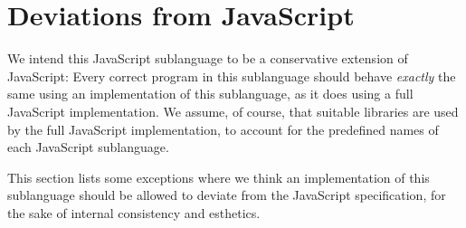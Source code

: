 \section*{Deviations from JavaScript}

We intend this
JavaScript sublanguage to be a conservative extension
of JavaScript: Every correct
program in this sublanguage should behave \emph{exactly} the same
using an implementation of this sublanguage, as it does using a full JavaScript
implementation. We assume, of course, that suitable libraries are
used by the full JavaScript implementation, to account for the predefined names
of each JavaScript sublanguage.

This section lists some exceptions where we think an implementation of this sublanguage
should be allowed to deviate from the JavaScript specification, for the
sake of internal consistency and esthetics.

